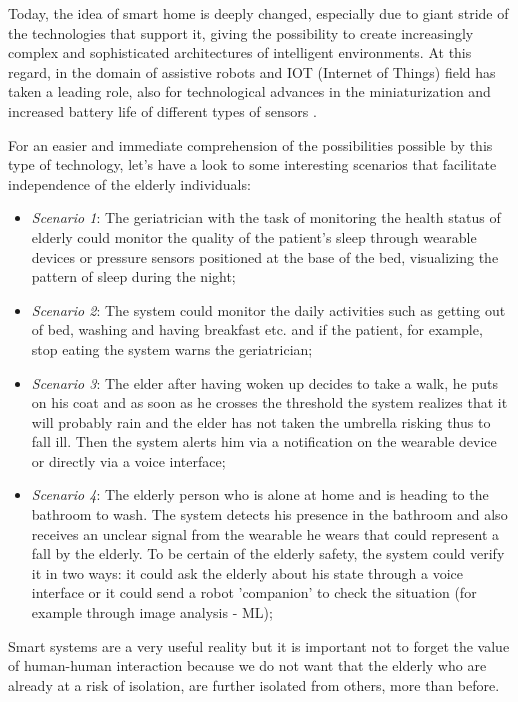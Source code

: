 \documentclass{thesisreport}
\begin{document}
 Today, the idea of smart home is deeply changed, especially due to giant stride of the technologies that support it, giving the possibility to create increasingly complex and sophisticated architectures of intelligent environments. At this regard, in the domain of assistive robots and IOT (Internet of Things) field has taken a leading role, also for technological advances in the miniaturization and increased battery life of different types of sensors \cite{phdthesis} \cite{nakashima2009handbook}.
 
 For an easier and immediate comprehension of the possibilities possible by this type of technology, let's have a look to some interesting scenarios that facilitate independence of the elderly individuals:
 \begin{itemize}
     \item \textit{Scenario 1}: The geriatrician with the task of monitoring the health status of elderly could monitor the quality of the patient's sleep through wearable devices or pressure sensors positioned at the base of the bed, visualizing the pattern of sleep during the night;
     \item \textit{Scenario 2}: The system could monitor the daily activities such as getting out of bed, washing and having breakfast etc. and if the patient, for example, stop eating the system warns the geriatrician;
     \item \textit{Scenario 3}: The elder after having woken up decides to take a walk, he puts on his coat and as soon as he crosses the threshold the system realizes that it will  probably rain and the elder has not taken the umbrella risking thus to fall ill. Then the system alerts him via a notification on the wearable device or directly via a voice interface;
     \item \textit{Scenario 4}: The elderly person who is alone at home  and is heading to the bathroom to wash. The system detects his presence in the bathroom and also receives an unclear signal from the wearable he wears that could represent a fall by the elderly. To be certain of the elderly safety, the system could verify it  in two ways: it could ask the elderly about his state through a voice interface or it could send a robot 'companion' to check the situation (for example through image analysis - ML);
\end{itemize}
 
 Smart systems are a very useful reality but it is important not to forget the value of human-human interaction because we do not want that the elderly who are already at a risk of isolation, are further isolated from others, more than before.
 
\end{document}
